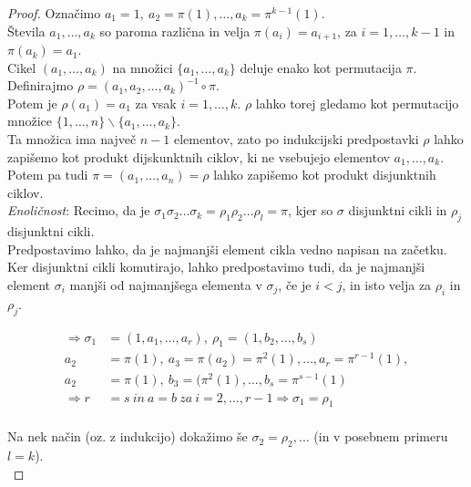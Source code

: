 \documentclass[a4paper,12pt]{article}
\begin{document}
\begin{proof}
Označimo $a_1=1,~a_2=\pi(1),\ldots,a_k=\pi^{k-1}(1)$. \\

Števila $a_1,\ldots,a_k$ so paroma različna in velja $\pi(a_i)=a_{i+1}$, za $i=1,\ldots,k-1$ in $\pi(a_k)=a_1$. \\

Cikel $(a_1,\ldots,a_k)$ na množici $\{a_1,\ldots,a_k\}$ deluje enako kot permutacija $\pi$. \\

\noindent Definirajmo $\rho=(a_1,a_2,\ldots,a_k)^{-1} \circ \pi$. \\

Potem je $\rho(a_1)=a_1$ za vsak  $i=1,\ldots,k$. $\rho$ lahko torej gledamo kot permutacijo množice $\{1,\ldots,n\} \backslash \{a_1,\ldots,a_k\}$. \\

Ta množica ima največ $n-1$ elementov, zato po indukcijski predpostavki $\rho$ lahko zapišemo kot produkt dijskunktnih ciklov, ki ne vsebujejo elementov $a_1,\ldots,a_k$. \\

\noindent Potem pa tudi $\pi=(a_1,\ldots,a_n)=\rho$ lahko zapišemo kot produkt  disjunktnih ciklov. \\

\noindent \textit{Enoličnost}: Recimo, da je $\sigma_1 \sigma_2 \ldots \sigma_k= \rho_1 \rho_2 \ldots \rho_l = \pi$, kjer so $\sigma$ disjunktni cikli in $\rho_j$ disjunktni cikli. \\

Predpostavimo lahko, da je najmanjši element cikla vedno napisan na začetku. \\

Ker disjunktni cikli komutirajo, lahko predpostavimo tudi, da je najmanjši element $\sigma_i$ manjši od najmanjšega elementa v $\sigma_j$, če je $i<j$, in isto velja za $\rho_i$ in $\rho_j$. 

\begin{align*}
\Rightarrow \sigma_1 & =(1,a_1,\ldots,a_r),~ \rho_1=(1,b_2,\ldots,b_s) \\
a_2 & =\pi(1),~a_3=\pi(a_2)=\pi^2(1),\ldots,a_r=\pi^{r-1}(1), \\
a_2 & =\pi(1),~b_3=(\pi^2(1),\ldots,b_s=\pi^{s-1}(1) \\
\Rightarrow r & =s~in~a=b~za~i=2,\ldots,r-1 \Rightarrow \sigma_1=\rho_1 \\
\end{align*}

\noindent Na nek način (oz. z indukcijo) dokažimo še $\sigma_2=\rho_2,\ldots$ (in v posebnem primeru $l=k$).\\
\end{proof}
\end{document}
